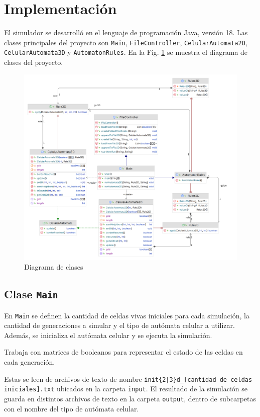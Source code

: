 \section{Implementación}
\label{sec:implementacion}

El simulador se desarrolló en el lenguaje de programación Java, versión 18.
Las clases principales del proyecto son \texttt{Main}, \texttt{FileController}, \texttt{CelularAutomata2D}, \texttt{CelularAutomata3D} y \texttt{AutomatonRules}.
En la Fig. {\ref{fig:uml}} se muestra el diagrama de clases del proyecto.

\begin{figure}[H]
    \centering
    \includegraphics[width=1\textwidth]{Images/uml_light}
    \caption{Diagrama de clases}
    \label{fig:uml}
\end{figure}

\subsection{Clase \texttt{Main}}
\label{subsec:main}
En \texttt{Main} se definen la cantidad de celdas vivas iniciales para cada simulación, la cantidad de generaciones a simular y el tipo de autómata celular a utilizar.
Además, se inicializa el autómata celular y se ejecuta la simulación.

Trabaja con matrices de booleanos para representar el estado de las celdas en cada generación.

Estas se leen de archivos de texto de nombre \texttt{init\{2|3\}d\_[cantidad de celdas iniciales].txt} ubicados en la carpeta \texttt{input}.
El resultado de la simulación se guarda en distintos archivos de texto en la carpeta \texttt{output}, dentro de subcarpetas con el nombre del tipo de autómata celular.

